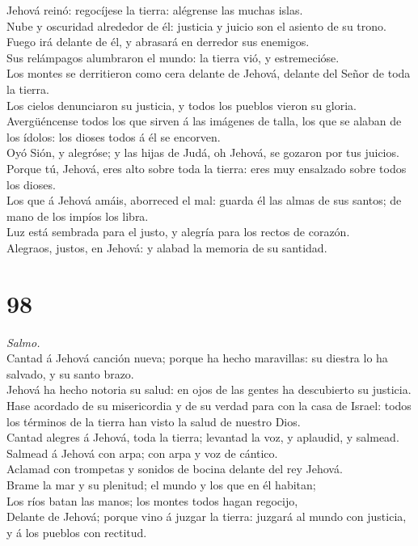  Jehová reinó: regocíjese la tierra: alégrense las muchas
islas.\\
 Nube y oscuridad alrededor de él: justicia y juicio son el
asiento de su trono.\\
 Fuego irá delante de él, y abrasará en derredor sus
enemigos.\\
 Sus relámpagos alumbraron el mundo: la tierra vió, y
estremecióse.\\
 Los montes se derritieron como cera delante de Jehová,
delante del Señor de toda la tierra.\\
 Los cielos denunciaron su justicia, y todos los pueblos
vieron su gloria.\\
 Avergüéncense todos los que sirven á las imágenes de talla,
los que se alaban de los ídolos: los dioses todos á él se encorven.\\
 Oyó Sión, y alegróse; y las hijas de Judá, oh Jehová, se
gozaron por tus juicios.\\
 Porque tú, Jehová, eres alto sobre toda la tierra: eres muy
ensalzado sobre todos los dioses.\\
 Los que á Jehová amáis, aborreced el mal: guarda él las
almas de sus santos; de mano de los impíos los libra.\\
 Luz está sembrada para el justo, y alegría para los rectos
de corazón.\\
 Alegraos, justos, en Jehová: y alabad la memoria de su
santidad.

\hypertarget{section-97}{%
\section{98}\label{section-97}}

 \emph{Salmo.}\\
Cantad á Jehová canción nueva; porque ha hecho maravillas: su diestra lo
ha salvado, y su santo brazo.\\
 Jehová ha hecho notoria su salud: en ojos de las gentes ha
descubierto su justicia.\\
 Hase acordado de su misericordia y de su verdad para con la
casa de Israel: todos los términos de la tierra han visto la salud de
nuestro Dios.\\
 Cantad alegres á Jehová, toda la tierra; levantad la voz, y
aplaudid, y salmead.\\
 Salmead á Jehová con arpa; con arpa y voz de cántico.\\
 Aclamad con trompetas y sonidos de bocina delante del rey
Jehová.\\
 Brame la mar y su plenitud; el mundo y los que en él
habitan;\\
 Los ríos batan las manos; los montes todos hagan
regocijo,\\
 Delante de Jehová; porque vino á juzgar la tierra: juzgará
al mundo con justicia, y á los pueblos con rectitud.

